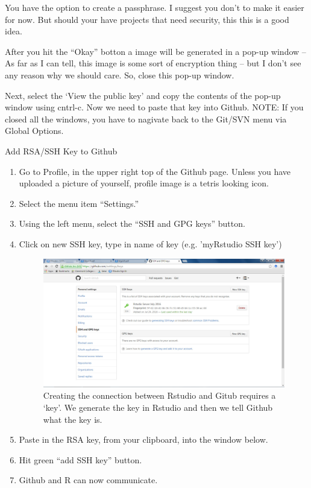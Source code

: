 \documentclass[12pt]{../SOP3_beta}
\begin{document}
\NP You have the option to create a passphrase. I suggest you don't to make it easier for now. But should your have projects that need security, this this is a good idea.

\NP After you hit the ``Okay'' botton a image will be generated in a pop-up window -- As far as I can tell, this image is some sort of encryption thing -- but I don't see any reason why we should care. So, close this pop-up window. 

\NP Next, select the `View the public key' and copy the contents of the pop-up window using cntrl-c. Now we need to paste that key into Github. NOTE: If you closed all the windows, you have to nagivate back to the Git/SVN menu via Global Options. 

\NP Add RSA/SSH Key to Github
  \begin{enumerate}
  \item Go to Profile, in the upper right top of the Github page. Unless you have uploaded a picture of yourself, profile image is a tetris looking icon.
  \item Select the menu item ``Settings.''
  \item Using the left menu, select the ``SSH and GPG keys'' button.
  \item Click on new SSH key, type in name of key (e.g. 'myRstudio SSH key')
  
\begin{figure}
\includegraphics{graphics/Github_SavedSSH.jpg}
\caption{Creating the connection between Rstudio and Gitub requires a `key'. We generate the key in Rstudio and then we tell Github what the key is.}
\end{figure}

  \item Paste in the RSA key, from your clipboard, into the window below.
  \item Hit green ``add SSH key'' button.
  \item Github and R can now communicate.
  \end{enumerate}
\end{document}

